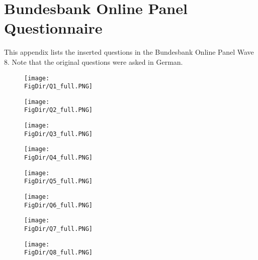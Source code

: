 \documentclass[\econtexRoot/ProjectABM]{subfiles}
\begin{document}
\let\TableWidth\relax
{\newlength\TableWidth}

\section{Bundesbank Online Panel Questionnaire}\label{sec:ApndxQuestionnaire}
This appendix lists the inserted questions in the Bundesbank Online Panel Wave 8. Note that the original questions were asked in German.
\begin{figure}[h]
	\centering
	\texttt{[image: \\FigDir/Q1\_full.PNG]}
\end{figure}
\begin{figure}[h]
	\centering
	\texttt{[image: \\FigDir/Q2\_full.PNG]}
\end{figure}
\begin{figure}[h]
	\centering
	\texttt{[image: \\FigDir/Q3\_full.PNG]}
\end{figure}
\begin{figure}[h]
	\centering
	\texttt{[image: \\FigDir/Q4\_full.PNG]}
\end{figure}
\begin{figure}[h]
	\centering
	\texttt{[image: \\FigDir/Q5\_full.PNG]}
\end{figure}
\begin{figure}[h]
	\centering
	\texttt{[image: \\FigDir/Q6\_full.PNG]}
\end{figure}
\begin{figure}[h]
	\centering
	\texttt{[image: \\FigDir/Q7\_full.PNG]}
\end{figure}
\begin{figure}[h]
	\centering
	\texttt{[image: \\FigDir/Q8\_full.PNG]}
\end{figure}

\end{document}

